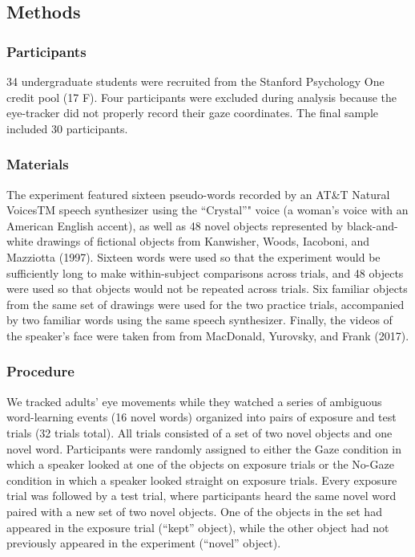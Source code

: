 \documentclass[man,floatsintext]{apa6}
\begin{document}
\subsection{Methods}\label{methods-1}

\subsubsection{Participants}\label{participants-1}

34 undergraduate students were recruited from the Stanford Psychology
One credit pool (17 F). Four participants were excluded during analysis
because the eye-tracker did not properly record their gaze coordinates.
The final sample included 30 participants.

\subsubsection{Materials}\label{materials-1}

The experiment featured sixteen pseudo-words recorded by an AT\&T
Natural VoicesTM speech synthesizer using the \enquote{Crystal}" voice
(a woman's voice with an American English accent), as well as 48 novel
objects represented by black-and-white drawings of fictional objects
from Kanwisher, Woods, Iacoboni, and Mazziotta (1997). Sixteen words
were used so that the experiment would be sufficiently long to make
within-subject comparisons across trials, and 48 objects were used so
that objects would not be repeated across trials. Six familiar objects
from the same set of drawings were used for the two practice trials,
accompanied by two familiar words using the same speech synthesizer.
Finally, the videos of the speaker's face were taken from from
MacDonald, Yurovsky, and Frank (2017).

\subsubsection{Procedure}\label{procedure-1}

We tracked adults' eye movements while they watched a series of
ambiguous word-learning events (16 novel words) organized into pairs of
exposure and test trials (32 trials total). All trials consisted of a
set of two novel objects and one novel word. Participants were randomly
assigned to either the Gaze condition in which a speaker looked at one
of the objects on exposure trials or the No-Gaze condition in which a
speaker looked straight on exposure trials. Every exposure trial was
followed by a test trial, where participants heard the same novel word
paired with a new set of two novel objects. One of the objects in the
set had appeared in the exposure trial (\enquote{kept} object), while
the other object had not previously appeared in the experiment
(\enquote{novel} object).
\end{document}
